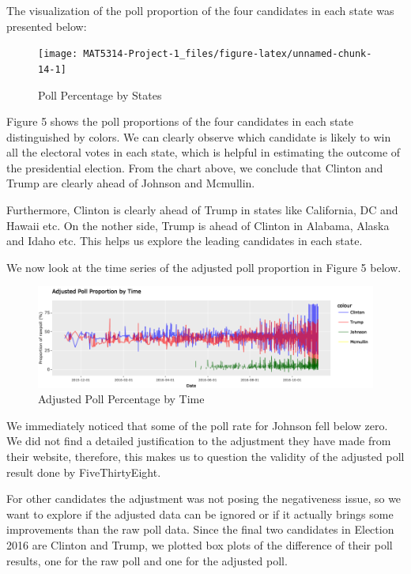 \documentclass[
  12pt,
]{article}
\begin{document}
The visualization of the poll proportion of the four candidates in each
state was presented below:

\begin{minipage}[t]{0.7\textwidth}
\begin{figure}
\texttt{[image: MAT5314-Project-1\_files/figure-latex/unnamed-chunk-14-1]} \caption{Poll Percentage by States}\label{fig:unnamed-chunk-14}
\end{figure}
\end{minipage}
\begin{minipage}[t]{0.3\textwidth}
\vspace{0pt}
Figure 5 shows the poll proportions of the four candidates in each state distinguished by colors. We can clearly observe which candidate is likely to win all the electoral votes in each state, which is helpful in estimating the outcome of the presidential election. From the chart above, we conclude that Clinton and Trump are clearly ahead of Johnson and Mcmullin. 
\end{minipage}

Furthermore, Clinton is clearly ahead of Trump in states like
California, DC and Hawaii etc. On the nother side, Trump is ahead of
Clinton in Alabama, Alaska and Idaho etc. This helps us explore the
leading candidates in each state.

We now look at the time series of the adjusted poll proportion in Figure
5 below.

\begin{figure}
\centering
\includegraphics[width=\textwidth,height=0.5\textheight]{./Figures/TsChart.png}
\caption{Adjusted Poll Percentage by Time}
\end{figure}

We immediately noticed that some of the poll rate for Johnson fell below
zero. We did not find a detailed justification to the adjustment they
have made from their website, therefore, this makes us to question the
validity of the adjusted poll result done by FiveThirtyEight.

For other candidates the adjustment was not posing the negativeness
issue, so we want to explore if the adjusted data can be ignored or if
it actually brings some improvements than the raw poll data. Since the
final two candidates in Election 2016 are Clinton and Trump, we plotted
box plots of the difference of their poll results, one for the raw poll
and one for the adjusted poll.
\end{document}

